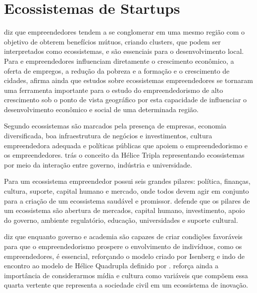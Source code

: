 \chapter[Ecossistemas de Startups]{Ecossistemas de Startups}
\label{cap-sobre-a-proposta-e-a-metodologia}

 diz que empreendedores tendem a se conglomerar em uma mesmo região com o objetivo de obterem benefícios mútuos, criando clusters, que podem ser interpretados como ecossistemas, e são essenciais para o desenvolvimento local. Para  e  empreendedores influenciam diretamente o crescimento econômico, a oferta de empregos, a redução da pobreza e a formação e o crescimento de cidades,  afirma ainda que estudos sobre ecossistemas empreendedores se tornaram uma ferramenta importante para o estudo do empreendedorismo de alto crescimento sob o ponto de vista geográfico por esta capacidade de influenciar o desenvolvimento econômico e social de uma determinada região.

Segundo  ecossistemas são marcados pela presença de empresas, economia diversificada, boa infraestrutura de negócios e investimentos, cultura empreendedora adequada e políticas públicas que apoiem o empreendedorismo e os empreendedores.  trás o conceito da Hélice Tripla representando ecossistemas por meio da interação entre governo, indústria e universidade.

Para  um ecossistema empreendedor possui seis grandes pilares: política, finanças, cultura, suporte, capital humano e mercado, onde todos devem agir em conjunto para a criação de um ecossistema saudável e promissor.  defende que os pilares de um ecossistema são abertura de mercados, capital humano, investimento, apoio do governo, ambiente regulatório, educação, universidades e suporte cultural.

 diz que enquanto governo e academia são capazes de criar condições favoráveis para que o empreendedorismo prospere o envolvimento de indivíduos, como os empreendedores, é essencial, reforçando o modelo criado por Isenberg e indo de encontro ao modelo de Hélice Quadrupla definido por .  reforça ainda a importância de considerarmos mídia e cultura como variáveis que compõem essa quarta vertente que representa a sociedade civil em um ecossistema de inovação.

